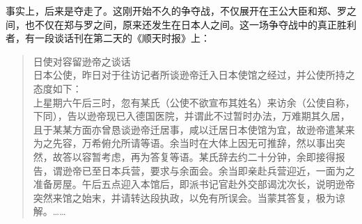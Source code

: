 事实上，后来是夺走了。这刚开始不久的争夺战，不仅展开在王公大臣和郑、罗之间，也不仅在郑与罗之间，原来还发生在日本人之间。这一场争夺战中的真正胜利者，有一段谈话刊在第二天的《顺天时报》上：\\

\begin{quote}
	日使对容留逊帝之谈话\\

日本公使，昨日对于往访记者所谈逊帝迁入日本使馆之经过，并公使所持之态度如下：\\

上星期六午后三时，忽有某氏（公使不欲宣布其姓名）来访余（公使自称，下同），告以逊帝现已入德国医院，并谓此不过暂时办法，万难期其久居，且于某某方面亦曾恳谈逊帝迁居事，咸以迁居日本使馆为宜，故逊帝遣某来为之先容，万希俯允所请等语。余当时在大体上因无可推辞，然以事出突然，故答以容暂考虑，再为答复等语。某氏辞去约二十分钟，余即接得报告，谓逊帝已至日本兵营，要求与余面会。余当即亲赴兵营迎近，一面为之准备房屋。午后五点迎入本馆后，即派书记官赴外交部谒沈次长，说明逊帝突然来馆之始末，并请转达段执政，以免有所误会。当蒙其答复，极为谅解。……\\
\end{quote}
